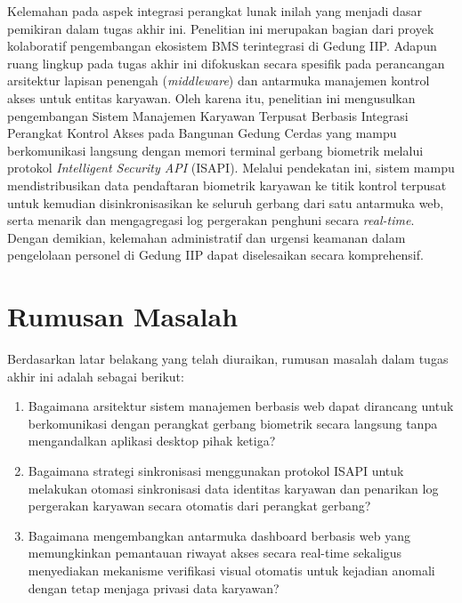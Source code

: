 Kelemahan pada aspek integrasi perangkat lunak inilah yang menjadi dasar pemikiran dalam tugas akhir ini. Penelitian ini merupakan bagian dari proyek kolaboratif pengembangan ekosistem BMS terintegrasi di Gedung IIP. Adapun ruang lingkup pada tugas akhir ini difokuskan secara spesifik pada perancangan arsitektur lapisan penengah (\textit{middleware}) dan antarmuka manajemen kontrol akses untuk entitas karyawan. Oleh karena itu, penelitian ini mengusulkan pengembangan Sistem Manajemen Karyawan Terpusat Berbasis Integrasi Perangkat Kontrol Akses pada Bangunan Gedung Cerdas yang mampu berkomunikasi langsung dengan memori terminal gerbang biometrik melalui protokol \textit{Intelligent Security API} (ISAPI). Melalui pendekatan ini, sistem mampu mendistribusikan data pendaftaran biometrik karyawan ke titik kontrol terpusat untuk kemudian disinkronisasikan ke seluruh gerbang dari satu antarmuka web, serta menarik dan mengagregasi log pergerakan penghuni secara \textit{real-time}. Dengan demikian, kelemahan administratif dan urgensi keamanan dalam pengelolaan personel di Gedung IIP dapat diselesaikan secara komprehensif.

\section{Rumusan Masalah}
Berdasarkan latar belakang yang telah diuraikan, rumusan masalah dalam tugas akhir ini adalah sebagai berikut:
\begin{enumerate}
    \item Bagaimana arsitektur sistem manajemen berbasis web dapat dirancang untuk berkomunikasi dengan perangkat gerbang biometrik secara langsung tanpa mengandalkan aplikasi desktop pihak ketiga?
    \item Bagaimana strategi sinkronisasi menggunakan protokol ISAPI untuk melakukan otomasi sinkronisasi data identitas karyawan dan penarikan log pergerakan karyawan secara otomatis dari perangkat gerbang?
    \item Bagaimana mengembangkan antarmuka dashboard berbasis web yang memungkinkan pemantauan riwayat akses secara real-time sekaligus menyediakan mekanisme verifikasi visual otomatis untuk kejadian anomali dengan tetap menjaga privasi data karyawan?
\end{enumerate}


